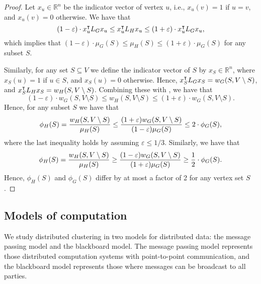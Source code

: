 \begin{proof}
Let $x_u\in\mathbb{R}^n$ be the indicator vector of vertex $u$, i.e., $x_u(v)=1$ if $u=v$, and $x_u(v)=0$ otherwise. We have that \[
(1-\varepsilon)\cdot x_u^{\intercal} L_Gx_u \leq x_u^{\intercal} L_H x_u  \leq (1+\varepsilon)\cdot x_u^{\intercal} L_G x_u,
\]
which  implies that  $
(1-\varepsilon)\cdot\mu_G(S)\leq \mu_H(S)\leq (1+\varepsilon)\cdot \mu_G(S)$ for any subset $S$.

Similarly, for any set $S\subseteq V$ we define the indicator vector of $S$ by $x_S\in\mathbb{R}^n$, where $x_S(u)=1$ if $u\in S$, and $x_S(u)=0$ otherwise. Hence, $x_S^{\intercal}L_Gx_S=w_G(S,V\setminus S)$, and $x_S^{\intercal}L_Hx_S=w_H(S,V\setminus S)$. Combining these with , we have that 
\[
(1-\varepsilon)\cdot w_G(S, V\setminus S)\leq w_H(S, V\setminus S)\leq (1+\varepsilon)\cdot w_G(S, V\setminus S).
\]
Hence, for any subset $S$ we have that 
\[
\phi_H(S) =\frac{w_H(S, V\setminus S)}{\mu_H(S)} \leq \frac{(1+\varepsilon) w_G(S, V\setminus S)}{(1-\varepsilon) \mu_G(S) } \leq 2\cdot\phi_G(S),
\]
where the last inequality holds by assuming $\varepsilon\leq 1/3$. Similarly, we have that
\[
\phi_H(S) =\frac{w_H(S, V\setminus S)}{\mu_H(S)} \geq \frac{(1-\varepsilon) w_G(S, V\setminus S)}{(1+\varepsilon) \mu_G(S) } \geq \frac{1}{2}\cdot\phi_G(S).
\]
Hence,   $\phi_H(S)$ and $\phi_G(S)$ differ by at most a factor of 2 for any vertex set $S$. 
\end{proof}

 
 

\subsection{Models of computation}  We  study distributed clustering in two models for distributed data: the message passing model and the blackboard model. The message passing model represents those distributed computation systems with point-to-point communication, and the blackboard model represents those where messages can be broadcast to all parties. 

